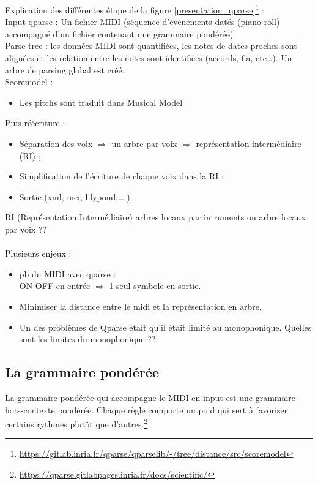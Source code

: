 Explication des différentes étape de la figure \ref{presentation_qparse}\footnote{\url{https://gitlab.inria.fr/qparse/qparselib/-/tree/distance/src/scoremodel}} :\\
Input qparse : Un fichier MIDI (séquence d’événements datés (piano roll) accompagné d’un fichier contenant une grammaire pondérée)\\
Parse tree : les données MIDI sont quantifiées, les notes de dates proches sont alignées et les relation entre les notes sont identifiées (accords, fla, etc…). Un arbre de parsing global est créé.\\
Scoremodel :
\begin{itemize}
	\item Les pitchs sont traduit dans Musical Model
\end{itemize}

Puis réécriture :
\begin{itemize}
	\item Séparation des voix $\Rightarrow$ un arbre par voix $\Rightarrow$ représentation intermédiaire (RI) ;
	\item Simplification de l’écriture de chaque voix dans la RI ;
	\item Sortie (xml, mei, lilypond,… )\\
\end{itemize}
RI (Représentation Intermédiaire) arbres locaux par intruments ou arbre locaux par voix ??\\\\
Plusieurs enjeux :
\begin{itemize}
	\item pb du MIDI avec qparse :\\
	ON-OFF en entrée $\Rightarrow$ 1 seul symbole en sortie.
	\item Minimiser la distance entre le midi et la représentation en arbre.
	\item Un des problèmes de Qparse était qu’il était limité au monophonique.
	Quelles sont les limites du monophonique ??
\end{itemize}

\subsection*{La grammaire pondérée}
La grammaire pondérée qui accompagne le MIDI en input est une grammaire hors-contexte pondérée. Chaque règle comporte un poid qui sert à favoriser certains rythmes plutôt que d’autres.\footnote{\url{https://qparse.gitlabpages.inria.fr/docs/scientific/}}
